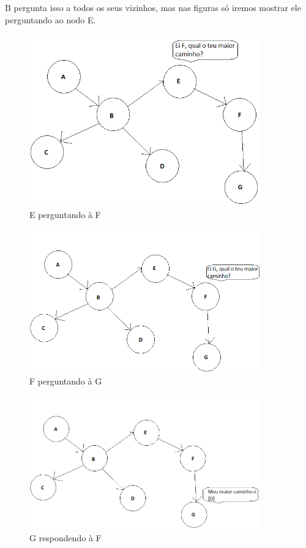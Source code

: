 \documentclass[12pt]{article}
\begin{document}
B pergunta isso a todos os seus vizinhos, mas nas figuras só iremos mostrar ele
perguntando ao nodo E.

\begin{figure}[H]
\centering
\includegraphics[width=100mm]{graphE.png}
\caption{E perguntando à F}
\label{graphE}
\end{figure}

\begin{figure}[H]
\centering
\includegraphics[width=100mm]{graphF.png}
\caption{F perguntando à G}
\label{graphF}
\end{figure}

\begin{figure}[H]
\centering
\includegraphics[width=100mm]{graphGr.png}
\caption{G respondendo à F}
\label{graphGr}
\end{figure}
\end{document}
